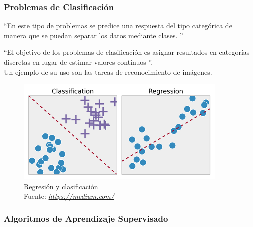 \subsubsection*{Problemas de Clasificación}
\textquotedblleft En este tipo de problemas se predice una respuesta del tipo categórica de manera que se puedan separar los datos mediante clases. \textquotedblright \cite{WEBSITE:2}

\textquotedblleft El objetivo de los problemas de clasificación es asignar resultados en categorías discretas en lugar de estimar valores continuos \textquotedblright \cite{WEBSITE:1}.\\
Un ejemplo de su uso son las tareas de reconocimiento de imágenes.

\begin{figure}[H]
	\centering
	\includegraphics[width=0.9\textwidth]{Figures/regreclas.png}
	\caption{Regresión y clasificación \\ Fuente:  \href{https://medium.com/deep-math-machine-learning-ai/different-types-of-machine-learning-and-their-types-34760b9128a2}{\textit{https://medium.com/}}}
	\label{Regresion}
\end{figure} 

\subsubsection*{Algoritmos de Aprendizaje Supervisado}
